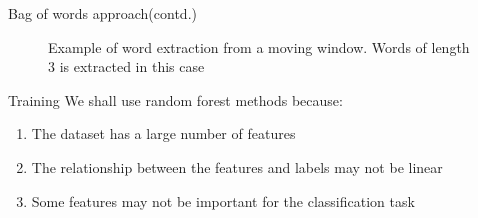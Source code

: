 \begin{frame}{Bag of words approach(contd.)}
\begin{figure}
    \caption*{Example of word extraction from a moving window. Words of length 3 is extracted in this case}
        \label{fig:my_label}
    \end{figure}
\end{frame}

\begin{frame}{Training}
    We shall use random forest methods because:
    \begin{enumerate}[$\bullet$]
    \item The dataset has a large number of features\pause
    \item The relationship between the features and labels may not be linear\pause
    \item Some features may not be important for the classification task
\end{enumerate}
\end{frame}

